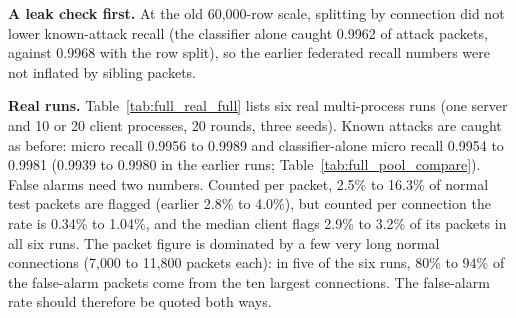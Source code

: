 \textbf{A leak check first.} At the old 60{,}000-row scale, splitting by connection did not lower known-attack recall (the classifier alone caught 0.9962 of attack packets, against 0.9968 with the row split), so the earlier federated recall numbers were not inflated by sibling packets.

\textbf{Real runs.} Table~\ref{tab:full_real_full} lists six real multi-process runs (one server and 10 or 20 client processes, 20 rounds, three seeds). Known attacks are caught as before: micro recall 0.9956 to 0.9989 and classifier-alone micro recall 0.9954 to 0.9981 (0.9939 to 0.9980 in the earlier runs; Table~\ref{tab:full_pool_compare}). False alarms need two numbers. Counted per packet, 2.5\% to 16.3\% of normal test packets are flagged (earlier 2.8\% to 4.0\%), but counted per connection the rate is 0.34\% to 1.04\%, and the median client flags 2.9\% to 3.2\% of its packets in all six runs. The packet figure is dominated by a few very long normal connections (7{,}000 to 11{,}800 packets each): in five of the six runs, 80\% to 94\% of the false-alarm packets come from the ten largest connections. The false-alarm rate should therefore be quoted both ways.

